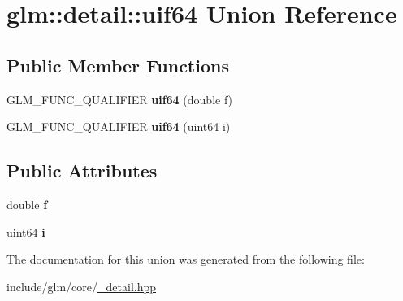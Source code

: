 \hypertarget{unionglm_1_1detail_1_1uif64}{\section{glm\-:\-:detail\-:\-:uif64 \-Union \-Reference}
\label{unionglm_1_1detail_1_1uif64}
}
\subsection*{\-Public \-Member \-Functions}
\begin{DoxyCompactItemize}
\item 
\hypertarget{unionglm_1_1detail_1_1uif64_a811b699ddc7ad7d8fd2a5d7124ec2ca2}{\-G\-L\-M\-\_\-\-F\-U\-N\-C\-\_\-\-Q\-U\-A\-L\-I\-F\-I\-E\-R {\bfseries uif64} (double f)}\label{unionglm_1_1detail_1_1uif64_a811b699ddc7ad7d8fd2a5d7124ec2ca2}

\item 
\hypertarget{unionglm_1_1detail_1_1uif64_ac81669b0cdc1ee96b079ee04eef05a36}{\-G\-L\-M\-\_\-\-F\-U\-N\-C\-\_\-\-Q\-U\-A\-L\-I\-F\-I\-E\-R {\bfseries uif64} (uint64 i)}\label{unionglm_1_1detail_1_1uif64_ac81669b0cdc1ee96b079ee04eef05a36}

\end{DoxyCompactItemize}
\subsection*{\-Public \-Attributes}
\begin{DoxyCompactItemize}
\item 
\hypertarget{unionglm_1_1detail_1_1uif64_aab66f17623b23da00e1a3dc0c0b8b85c}{double {\bfseries f}}\label{unionglm_1_1detail_1_1uif64_aab66f17623b23da00e1a3dc0c0b8b85c}

\item 
\hypertarget{unionglm_1_1detail_1_1uif64_a198f5a44e3d46830cb49381bacbb28a5}{uint64 {\bfseries i}}\label{unionglm_1_1detail_1_1uif64_a198f5a44e3d46830cb49381bacbb28a5}

\end{DoxyCompactItemize}


\-The documentation for this union was generated from the following file\-:\begin{DoxyCompactItemize}
\item 
include/glm/core/\hyperlink{__detail_8hpp}{\-\_\-detail.\-hpp}\end{DoxyCompactItemize}
